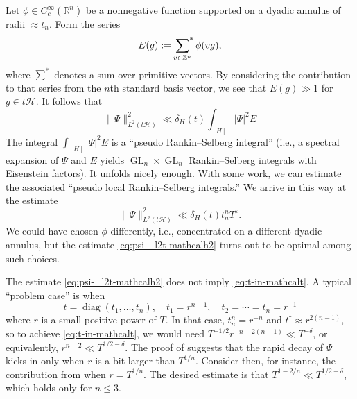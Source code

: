 \documentclass[reqno]{amsart}
\DeclareMathOperator{\GL}{GL}
\def\eps{\varepsilon}
\DeclareMathOperator{\diag}{diag}
\theoremstyle{plain} \newtheorem{theorem} {Theorem}
\theoremstyle{definition} \newtheorem{definition} [theorem] {Definition}
\theoremstyle{itplain} %
\numberwithin{equation}{section}
\numberwithin{theorem}{section}
\renewcommand{\leq}{\leqslant}
\begin{document}
Let $\phi \in C_c^\infty(\mathbb{R}^n)$ be a nonnegative function supported on a dyadic annulus of radii $\approx t_n$.  Form the series
\begin{equation*}
E(g) := \sideset{}{^*}\sum _{v \in \mathbb{Z}^n} \phi(v g),
\end{equation*}
where $\sum^*$ denotes a sum over primitive vectors.  By considering the contribution to that series from the $n$th standard basis vector, we see that $E(g) \gg 1$ for $g \in t \mathcal{H}$.  It follows that
\begin{equation*}
\|\Psi \|^2_{L^2(t \mathcal{H})} \ll \delta_H(t) \int _{[H]} |\Psi|^2 E
\end{equation*}
 The integral $\int _{[H]} |\Psi|^2 E$ is a ``pseudo Rankin--Selberg integral'' (i.e., a spectral expansion of $\Psi$ and $E$ yields $\GL_n \times \GL_n$ Rankin--Selberg integrals with Eisenstein factors).  It unfolds nicely enough.  With some work, we can estimate the associated ``pseudo local Rankin--Selberg integrals.''  We arrive in this way at the estimate
\begin{equation}\label{eq:psi-_l2t-mathcalh2}
\|\Psi \|_{L^2(t \mathcal{H})}^2 \ll \delta_H(t) t_n^n T^{\eps}.
\end{equation}
We could have chosen $\phi$ differently, i.e., concentrated on a different dyadic annulus, but the estimate \eqref{eq:psi-_l2t-mathcalh2} turns out to be optimal among such choices.

The estimate \eqref{eq:psi-_l2t-mathcalh2} does not imply \eqref{eq:t-in-mathcalt}.  A typical ``problem case'' is when
\begin{equation}\label{eq:t-=-diagt_1}
  t = \diag(t_1,\dotsc,t_n),
  \quad
  t_1 = r^{n-1}, \quad
  t_2 = \dotsb = t_n = r^{-1}
\end{equation}
where $r$ is a small positive power of $T$.  In that case, $t_n^n = r^{-n}$ and $t ^\dagger \approx r^{2 (n-1)}$, so to achieve \eqref{eq:t-in-mathcalt}, we would need $T^{-1/2} r^{-n + 2 (n - 1)} \ll T^{-\delta}$, or equivalently, $r^{n - 2} \ll T^{1/2 - \delta}$.  The proof of \cite[Thm 3]{MR4093914} suggests that the rapid decay of $\Psi$ kicks in only when $r$ is a bit larger than $T^{1/n}$.  Consider then, for instance, the contribution from when $r = T^{1/n}$.  The desired estimate is that $T^{1 - 2/n} \ll T^{1/2 - \delta}$, which holds only for $n \leq 3$.
\end{document}

